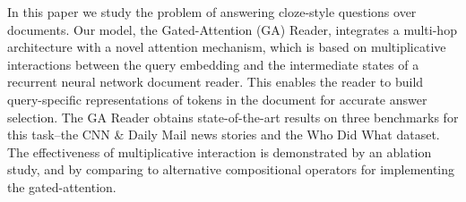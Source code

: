 In this paper we study the problem of answering cloze-style questions over documents. Our model, the Gated-Attention (GA) Reader, integrates a multi-hop architecture with a novel attention mechanism, which is based on multiplicative interactions between the query embedding and the intermediate states of a recurrent neural network document reader. This enables the reader to build query-specific representations of tokens in the document for accurate answer selection. The GA Reader obtains state-of-the-art results on three benchmarks for this task--the CNN \& Daily Mail news stories and the Who Did What dataset. The effectiveness of multiplicative interaction is demonstrated by an ablation study, and by comparing to alternative compositional operators for implementing the gated-attention.
